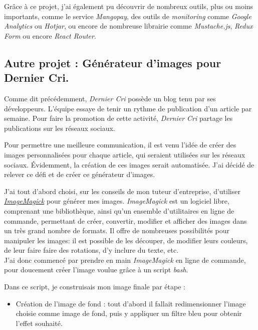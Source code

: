 \bigskip

Grâce à ce projet, j'ai également pu découvrir de nombreux outils, plus
ou moins importants, comme le service \emph{Mangopay}, des outils de
\emph{monitoring} comme \emph{Google Analytics} ou \emph{Hotjar}, ou
encore de nombreuse librairie comme \emph{Mustache.js}, \emph{Redux
Form} ou encore \emph{React Router}.

\bigskip

\subsection{Autre projet : Générateur d'images pour Dernier
Cri.}\label{autre-projet-guxe9nuxe9rateur-dimages-pour-dernier-cri.}

\bigskip

Comme dit précédemment, \emph{Dernier Cri} possède un blog tenu par ses
développeurs. L'équipe essaye de tenir un rythme de publication d'un
article par semaine. Pour faire la promotion de cette activité,
\emph{Dernier Cri} partage les publications sur les réseaux sociaux.

\bigskip

Pour permettre une meilleure communication, il est venu l'idée de créer
des images personnalisées pour chaque article, qui seraient utilisées
sur les réseaux sociaux. Évidemment, la création de ces images serait
automatisée. J'ai décidé de relever ce défi et de créer ce générateur
d'images.

\bigskip

J'ai tout d'abord choisi, sur les conseils de mon tuteur d'entreprise,
d'utiliser
\href{https://www.imagemagick.org/script/index.php}{\emph{ImageMagick}}
pour générer mes images. \emph{ImageMagick} est un logiciel libre,
comprenant une bibliothèque, ainsi qu'un ensemble d'utilitaires en ligne
de commande, permettant de créer, convertir, modifier et afficher des
images dans un très grand nombre de formats. Il offre de nombreuses
possibilités pour manipuler les images: il est possible de les découper,
de modifier leurs couleurs, de leur faire faire des rotations, d'y
inclure du texte, etc.\\
J'ai donc commencé par prendre en main \emph{ImageMagick} en ligne de
commande, pour doucement créer l'image voulue grâce à un script
\emph{bash}.

\bigskip

Dans ce script, je construisais mon image finale par étape :

\begin{itemize}
\tightlist
\item
  Création de l'image de fond : tout d'abord il fallait redimensionner
  l'image choisie comme image de fond, puis y appliquer un filtre bleu
  pour obtenir l'effet souhaité.
\end{itemize}

